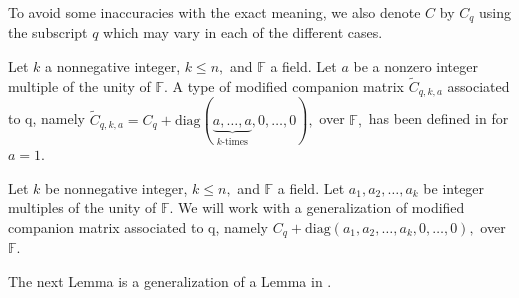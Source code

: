 \documentclass[11pt]{amsart}
\theoremstyle{definition}
\numberwithin{equation}{section}
\newcommand{\diag}{\mathrm{diag}}
\newcommand{\F}{\mathbb{F}}
\begin{document}
\noindent To avoid some inaccuracies with the exact meaning, we also denote $C$ by $C_q$ using the subscript $q$ which may vary in each of the different cases.

\medskip


Let $k$ a nonnegative integer, $k\leq n,$ and $\F$ a field. Let $a$ be a nonzero integer multiple of the unity of $\F$. A type of modified companion matrix $\widetilde{C}_{q,k,a}$ associated to q, namely
$\widetilde{C}_{q,k,a}=C_q+\diag (\underbrace{a,\dots,a }_{k \textrm{-times}} ,0,\dots,0),$ over $\F,$  has been defined in \cite{C} for $a=1$.

Let $k$ be nonnegative integer, $k\leq n,$ and $\F$ a field. Let $a_1,a_2,\dots,a_k$ be integer multiples of the unity of $\F$. We will work with a generalization of modified companion matrix  associated to q, namely
$C_q+\diag (a_1,a_2,\dots,a_k,0,\dots,0),$ over $\F.$

The next Lemma is a generalization of a Lemma in \cite{Pojar}.
\end{document}

